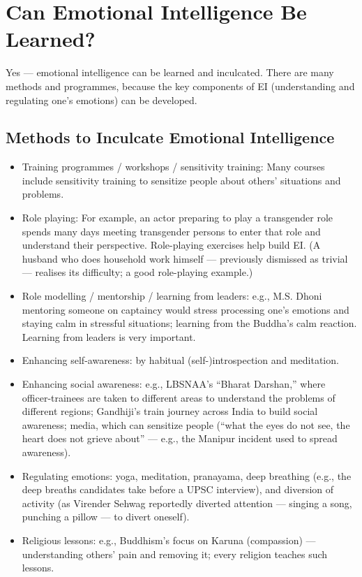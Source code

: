 \section{Can Emotional Intelligence Be Learned?}

Yes --- emotional intelligence can be learned and inculcated. There are many methods and programmes, because the key components of EI (understanding and regulating one's emotions) can be developed.

\subsection{Methods to Inculcate Emotional Intelligence}

\begin{itemize}
\item Training programmes / workshops / sensitivity training: Many courses include sensitivity training to sensitize people about others' situations and problems.
\item Role playing: For example, an actor preparing to play a transgender role spends many days meeting transgender persons to enter that role and understand their perspective. Role-playing exercises help build EI. (A husband who does household work himself --- previously dismissed as trivial --- realises its difficulty; a good role-playing example.)
\item Role modelling / mentorship / learning from leaders: e.g., M.S. Dhoni mentoring someone on captaincy would stress processing one's emotions and staying calm in stressful situations; learning from the Buddha's calm reaction. Learning from leaders is very important.
\item Enhancing self-awareness: by habitual (self-)introspection and meditation.
\item Enhancing social awareness: e.g., LBSNAA's ``Bharat Darshan,'' where officer-trainees are taken to different areas to understand the problems of different regions; Gandhiji's train journey across India to build social awareness; media, which can sensitize people (``what the eyes do not see, the heart does not grieve about'' --- e.g., the Manipur incident used to spread awareness).
\item Regulating emotions: yoga, meditation, pranayama, deep breathing (e.g., the deep breaths candidates take before a UPSC interview), and diversion of activity (as Virender Sehwag reportedly diverted attention --- singing a song, punching a pillow --- to divert oneself).
\item Religious lessons: e.g., Buddhism's focus on Karuna (compassion) --- understanding others' pain and removing it; every religion teaches such lessons.
\end{itemize}

